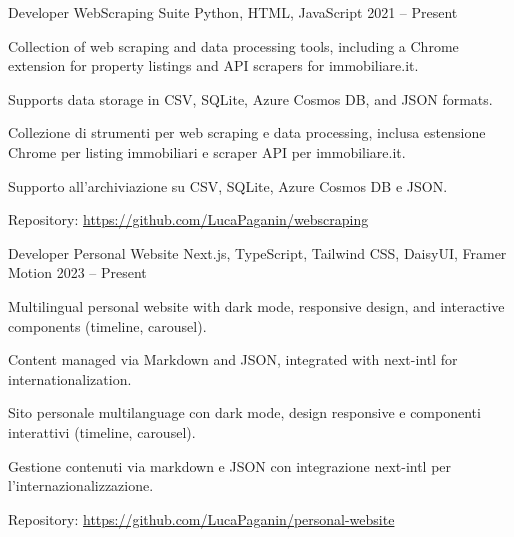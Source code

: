 \begin{cventries}

\cventry
{Developer} %
{WebScraping Suite} %
{Python, HTML, JavaScript} %
{2021 -- Present} %
{ %
\begin{cvitems}
  \ifenglish
  \item {Collection of web scraping and data processing tools, including a Chrome extension for property listings and API scrapers for immobiliare.it.}
  \item {Supports data storage in CSV, SQLite, Azure Cosmos DB, and JSON formats.}
  \else
  \item {Collezione di strumenti per web scraping e data processing, inclusa estensione Chrome per listing immobiliari e scraper API per immobiliare.it.}
  \item {Supporto all'archiviazione su CSV, SQLite, Azure Cosmos DB e JSON.}
  \fi
  \item {Repository: \url{https://github.com/LucaPaganin/webscraping}}  
\end{cvitems}
}


\cventry
{Developer} %
{Personal Website} %
{Next.js, TypeScript, Tailwind CSS, DaisyUI, Framer Motion} %
{2023 -- Present} %
{ %
\begin{cvitems}
  \ifenglish
  \item {Multilingual personal website with dark mode, responsive design, and interactive components (timeline, carousel).}
  \item {Content managed via Markdown and JSON, integrated with next-intl for internationalization.}
  \else
  \item {Sito personale multilanguage con dark mode, design responsive e componenti interattivi (timeline, carousel).}
  \item {Gestione contenuti via markdown e JSON con integrazione next-intl per l'internazionalizzazione.}
  \fi
  \item {Repository: \url{https://github.com/LucaPaganin/personal-website}}  
\end{cvitems}
}



\end{cventries}
